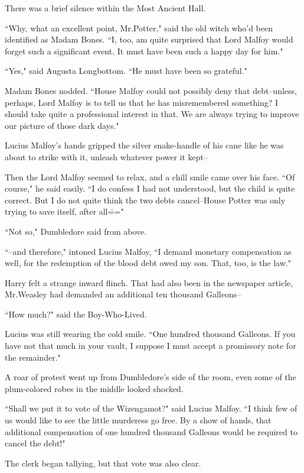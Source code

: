 There was a brief silence within the Most Ancient Hall.

``Why, what an excellent point, Mr.\?Potter," said the old witch who'd been identified as Madam Bones. ``I, too, am quite surprised that Lord Malfoy would forget such a significant event. It must have been such a happy day for him."

``Yes," said Augusta Longbottom. ``He must have been so grateful."

Madam Bones nodded. ``House Malfoy could not possibly deny that debt\---unless, perhaps, Lord Malfoy is to tell us that he has misremembered something? I should take quite a professional interest in that. We are always trying to improve our picture of those dark days."

Lucius Malfoy's hands gripped the silver snake-handle of his cane like he was about to strike with it, unleash whatever power it kept\---

Then the Lord Malfoy seemed to relax, and a chill smile came over his face. ``Of course," he said easily. ``I do confess I had not understood, but the child is quite correct. But I do not quite think the two debts cancel\---House Potter was only trying to save itself, after all\==="

``Not so," Dumbledore said from above.

``\---and therefore," intoned Lucius Malfoy, ``I demand monetary compensation as well, for the redemption of the blood debt owed my son. That, too, is the law."

Harry felt a strange inward flinch. That had also been in the newspaper article, Mr.\?Weasley had demanded an additional ten thousand Galleons\---

``How much?" said the Boy-Who-Lived.

Lucius was still wearing the cold smile. ``One hundred thousand Galleons. If you have not that much in your vault, I suppose I must accept a promissory note for the remainder."

A roar of protest went up from Dumbledore's side of the room, even some of the plum-colored robes in the middle looked shocked.

``Shall we put it to vote of the Wizengamot?" said Lucius Malfoy. ``I think few of us would like to see the little murderess go free. By a show of hands, that additional compensation of one hundred thousand Galleons would be required to cancel the debt!"

The clerk began tallying, but that vote was also clear.

